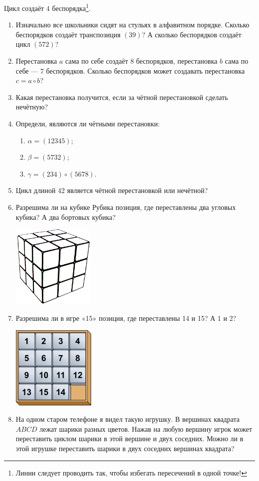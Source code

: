 \documentclass[12pt]{article} %
\begin{document}
Цикл создаёт 4 беспорядка\footnote{Линии следует проводить так, чтобы избегать пересечений в одной точке!}.

\begin{enumerate}
\item Изначально все школьники сидят на стульях в алфавитном порядке. Сколько беспорядков создаёт транспозиция $(39)$? А сколько беспорядков создаёт цикл $(572)$?
\item Перестановка $a$ сама по себе создаёт 8 беспорядков, перестановка $b$ сама по себе — $7$ беспорядков. Сколько беспорядков может создавать перестановка $c=a\circ b$?
\item Какая перестановка получится, если за чётной перестановкой сделать нечётную?
\item Определи, являются ли чётными перестановки:
  \begin{enumerate}
    \item $\alpha = (12345)$;
    \item $\beta = (5732)$;
    \item $\gamma = (234)\circ(5678)$.
  \end{enumerate}
\item Цикл длиной 42 является чётной перестановкой или нечётной?
\item Разрешима ли на кубике Рубика позиция, где переставлены два угловых кубика? А два бортовых кубика?

\begin{minipage}[c]{0.5\textwidth}
\centering
        \includegraphics[width=4cm]{figure/rubik_cube.png}
\end{minipage}

\item Разрешима ли в игре «15» позиция, где переставлены 14 и 15? А 1 и 2?

\begin{minipage}[c]{0.5\textwidth}
\centering
        \includegraphics[width=4cm]{figure/15-puzzle-loyd.png}
\end{minipage}
\item На одном старом телефоне я видел такую игрушку. В вершинах квадрата $ABCD$ лежат шарики разных цветов. Нажав на любую вершину игрок может переставить циклом шарики в этой вершине и двух соседних. Можно ли в этой игрушке переставить шарики в двух соседних вершинах квадрата?
\end{enumerate}
\end{document}
